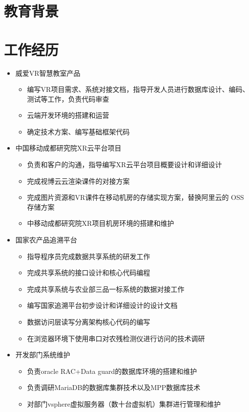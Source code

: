 \documentclass{resume}
\begin{document}
\section{教育背景}

\par

\section{工作经历}
\begin{itemize}
  \item 威爱VR智慧教室产品
  \begin{itemize}
    \item 编写VR项目需求、系统对接文档，指导开发人员进行数据库设计、编码、测试等工作，负责代码审查
    \item 云端开发环境的搭建和运营
    \item 确定技术方案、编写基础框架代码
  \end{itemize}
  \item 中国移动成都研究院XR云平台项目
  \begin{itemize}
    \item 负责和客户的沟通，指导编写XR云平台项目概要设计和详细设计
    \item 完成视博云云渲染课件的对接方案
    \item 完成图片资源和VR课件在移动机房的存储实现方案，替换阿里云的 OSS存储方案
    \item 中移动成都研究院XR项目机房环境的搭建和维护
  \end{itemize}
\end{itemize}

\begin{itemize}
  \item 国家农产品追溯平台
  \begin{itemize}
    \item 指导程序员完成数据共享系统的研发工作
    \item 完成共享系统的接口设计和核心代码编程
    \item 完成共享系统与农业部三品一标系统的数据对接工作
    \item 编写国家追溯平台初步设计和详细设计的设计文档
    \item 数据访问层读写分离架构核心代码的编写
    \item 在浏览器环境下使用串口对农残检测仪进行访问的技术调研
  \end{itemize}
  \item 开发部门系统维护
  \begin{itemize}
    \item 负责oracle RAC+Data guard的数据库环境的搭建和维护
    \item 负责调研MariaDB的数据库集群技术以及MPP数据库技术
    \item 对部门vsphere虚拟服务器（数十台虚拟机）集群进行管理和维护
  \end{itemize}
\end{itemize}
\end{document}
